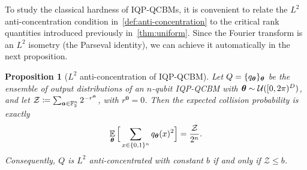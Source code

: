 \documentclass{article}
\theoremstyle{plain}
\newtheorem{proposition}[theorem]{Proposition}
\theoremstyle{definition}
\theoremstyle{remark}
\begin{document}
To study the classical hardness of IQP-QCBMs, it is convenient to relate the $L^2$ anti-concentration condition in~\cref{def:anti-concentration} to the critical rank quantities introduced previously  in~\cref{thm:uniform}. Since the Fourier transform is an $L^2$ isometry (the Parseval identity), we can achieve it automatically in the next proposition.

\begin{proposition}[$L^2$ anti-concentration of IQP-QCBM]
\label{lem:parseval}
Let $Q=\{q_{\bm{\theta}}\}_{\bm{\theta}}$ be the ensemble of output distributions of an
$n$-qubit IQP-QCBM with ${\bm{\theta}}\sim\mathcal U([0,2\pi)^D)$, and let
$\mathcal Z \coloneqq \sum_{{\bm{a}}\in\mathbb{F}_2^n} 2^{-r^{\bm{a}}}$, with $r^{\mathbf 0}=0$.
Then the expected collision probability is exactly
\begin{equation}\label{eq:collision-identity}
\operatorname*{\mathbb{E}}_{{\bm{\theta}}}\Big[\sum_{x\in\{0,1\}^n} q_{\bm{\theta}}(x)^2\Big]
= \frac{\mathcal Z}{2^n}.
\end{equation}
Consequently, $Q$ is $L^2$ anti-concentrated with constant $b$ if and only if
$\mathcal Z\le b$. 
\end{proposition}
\end{document}
